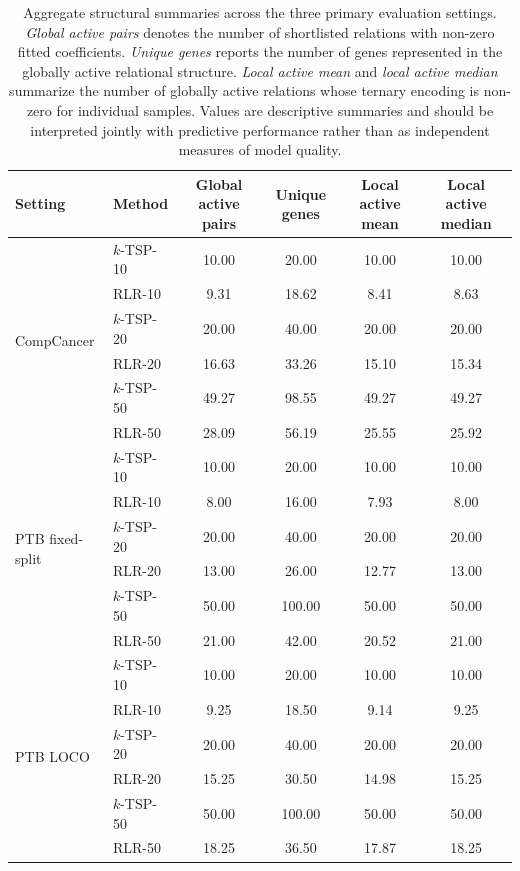 \documentclass[journal]{IEEEtran}
\begin{document}
\begin{table}[t]
\centering
\caption{Aggregate structural summaries across the three primary evaluation settings. \emph{Global active pairs} denotes the number of shortlisted relations with non-zero fitted coefficients. \emph{Unique genes} reports the number of genes represented in the globally active relational structure. \emph{Local active mean} and \emph{local active median} summarize the number of globally active relations whose ternary encoding is non-zero for individual samples. Values are descriptive summaries and should be interpreted jointly with predictive performance rather than as independent measures of model quality.}
\label{tab:world_structure}
\small
\setlength{\tabcolsep}{6pt}
\begin{tabular}{llcccc}
\toprule
\textbf{Setting} & \textbf{Method} &
\textbf{Global active pairs} &
\textbf{Unique genes} &
\textbf{Local active mean} &
\textbf{Local active median} \\
\midrule
\multirow{6}{*}{CompCancer}
& $k$-TSP-10 & 10.00 & 20.00 & 10.00 & 10.00 \\
& RLR-10     & 9.31  & 18.62 & 8.41  & 8.63 \\
& $k$-TSP-20 & 20.00 & 40.00 & 20.00 & 20.00 \\
& RLR-20     & 16.63 & 33.26 & 15.10 & 15.34 \\
& $k$-TSP-50 & 49.27 & 98.55 & 49.27 & 49.27 \\
& RLR-50     & 28.09 & 56.19 & 25.55 & 25.92 \\
\midrule
\multirow{6}{*}{PTB fixed-split}
& $k$-TSP-10 & 10.00 & 20.00 & 10.00 & 10.00 \\
& RLR-10     & 8.00  & 16.00 & 7.93  & 8.00 \\
& $k$-TSP-20 & 20.00 & 40.00 & 20.00 & 20.00 \\
& RLR-20     & 13.00 & 26.00 & 12.77 & 13.00 \\
& $k$-TSP-50 & 50.00 & 100.00 & 50.00 & 50.00 \\
& RLR-50     & 21.00 & 42.00 & 20.52 & 21.00 \\
\midrule
\multirow{6}{*}{PTB LOCO}
& $k$-TSP-10 & 10.00 & 20.00 & 10.00 & 10.00 \\
& RLR-10     & 9.25  & 18.50 & 9.14  & 9.25 \\
& $k$-TSP-20 & 20.00 & 40.00 & 20.00 & 20.00 \\
& RLR-20     & 15.25 & 30.50 & 14.98 & 15.25 \\
& $k$-TSP-50 & 50.00 & 100.00 & 50.00 & 50.00 \\
& RLR-50     & 18.25 & 36.50 & 17.87 & 18.25 \\
\bottomrule
\end{tabular}
\end{table}
\end{document}
